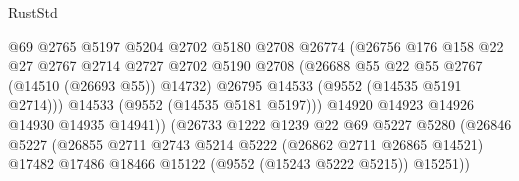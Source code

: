 \begin{lexlean}{RustStd}
\begin{coremodule}
                                          @69
                                          @2765
                                          @5197
                                          @5204
                                          @2702
                                          @5180
                                          @2708
                                          @26774
                                          (@26756
                                            @176
                                            @158
                                            @22
                                            @27
                                            @2767
                                            @2714
                                            @2727
                                            @2702
                                            @5190
                                            @2708
                                            (@26688 @55 @22 @55 @2767 (@14510 (@26693 @55)) @14732)
                                            @26795
                                            @14533
                                            (@9552 (@14535 @5191 @2714)))
                                          @14533
                                          (@9552 (@14535 @5181 @5197)))
                                        @14920
                                        @14923
                                        @14926
                                        @14930
                                        @14935
                                        @14941))
                                    (@26733
                                      @1222
                                      @1239
                                      @22
                                      @69
                                      @5227
                                      @5280
                                      (@26846
                                        @5227
                                        (@26855
                                          @2711
                                          @2743
                                          @5214
                                          @5222
                                          (@26862 @2711 @26865 @14521)
                                          @17482
                                          @17486
                                          @18466
                                          @15122
                                          (@9552 (@15243 @5222 @5215))
                                          @15251))

\end{coremodule}
\end{lexlean}
